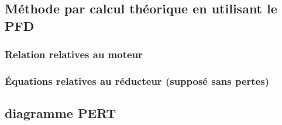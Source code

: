 \subsection{Méthode par calcul théorique en utilisant le PFD}
\subsubsection{Relation relatives au moteur}
\subsubsection{Équations relatives au réducteur (supposé sans pertes)}

\subsection{diagramme PERT}

